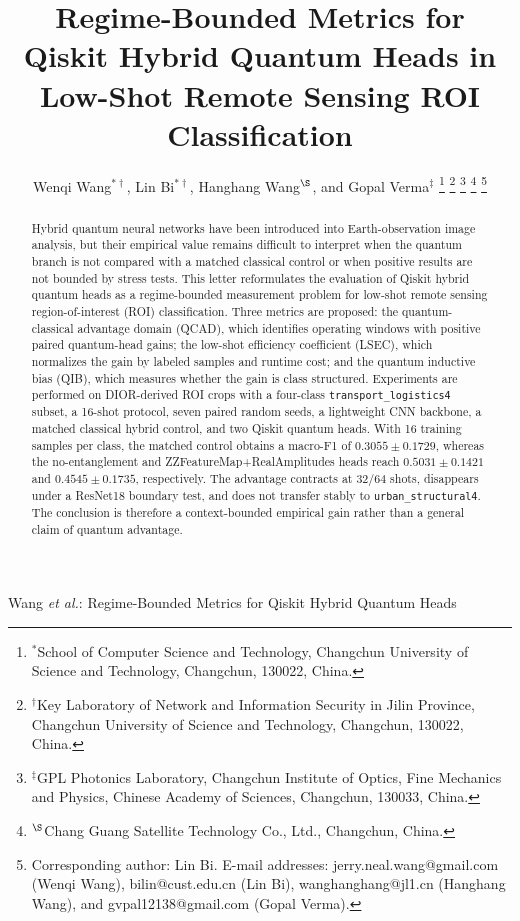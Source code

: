 \documentclass[journal]{IEEEtran}
\newcommand{\TL}{\texttt{transport\_logistics4}}
\newcommand{\URB}{\texttt{urban\_structural4}}
\begin{document}
\title{Regime-Bounded Metrics for Qiskit Hybrid Quantum Heads in Low-Shot Remote Sensing ROI Classification}

\author{Wenqi Wang$^{*\dagger}$, Lin Bi$^{*\dagger}$, Hanghang Wang$^{\S}$, and Gopal Verma$^{\ddagger}$%
\thanks{$^*$School of Computer Science and Technology, Changchun University of Science and Technology, Changchun, 130022, China.}%
\thanks{$^\dagger$Key Laboratory of Network and Information Security in Jilin Province, Changchun University of Science and Technology, Changchun, 130022, China.}%
\thanks{$^\ddagger$GPL Photonics Laboratory, Changchun Institute of Optics, Fine Mechanics and Physics, Chinese Academy of Sciences, Changchun, 130033, China.}%
\thanks{$^\S$Chang Guang Satellite Technology Co., Ltd., Changchun, China.}%
\thanks{Corresponding author: Lin Bi. E-mail addresses: jerry.neal.wang@gmail.com (Wenqi Wang), bilin@cust.edu.cn (Lin Bi), wanghanghang@jl1.cn (Hanghang Wang), and gvpal12138@gmail.com (Gopal Verma).}%
}

%
{Wang \MakeLowercase{\textit{et al.}}: Regime-Bounded Metrics for Qiskit Hybrid Quantum Heads}

\maketitle

\begin{abstract}
Hybrid quantum neural networks have been introduced into Earth-observation image analysis, but their empirical value remains difficult to interpret when the quantum branch is not compared with a matched classical control or when positive results are not bounded by stress tests. This letter reformulates the evaluation of Qiskit hybrid quantum heads as a regime-bounded measurement problem for low-shot remote sensing region-of-interest (ROI) classification. Three metrics are proposed: the quantum-classical advantage domain (QCAD), which identifies operating windows with positive paired quantum-head gains; the low-shot efficiency coefficient (LSEC), which normalizes the gain by labeled samples and runtime cost; and the quantum inductive bias (QIB), which measures whether the gain is class structured. Experiments are performed on DIOR-derived ROI crops with a four-class \TL{} subset, a 16-shot protocol, seven paired random seeds, a lightweight CNN backbone, a matched classical hybrid control, and two Qiskit quantum heads. With 16 training samples per class, the matched control obtains a macro-F1 of $0.3055\pm0.1729$, whereas the no-entanglement and ZZFeatureMap+RealAmplitudes heads reach $0.5031\pm0.1421$ and $0.4545\pm0.1735$, respectively. The advantage contracts at 32/64 shots, disappears under a ResNet18 boundary test, and does not transfer stably to \URB{}. The conclusion is therefore a context-bounded empirical gain rather than a general claim of quantum advantage.
\end{abstract}
\end{document}
